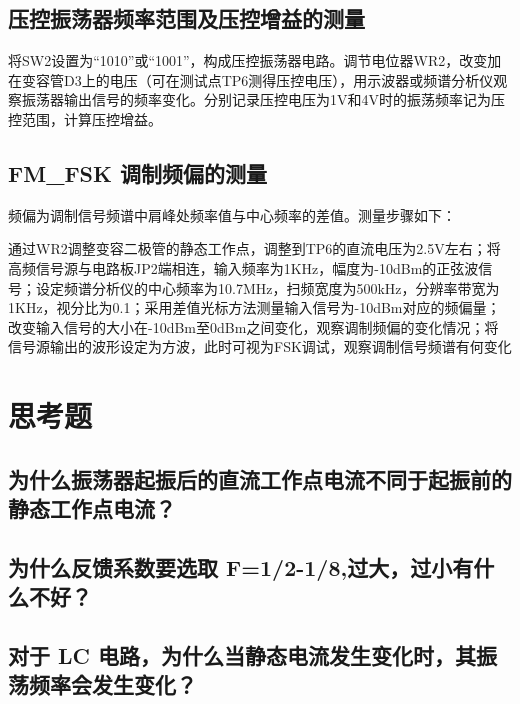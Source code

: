 \documentclass{../source/Experiment}
\begin{document}
\subsection{压控振荡器频率范围及压控增益的测量}

将SW2设置为“1010”或“1001”，构成压控振荡器电路。调节电位器WR2，改变加在变容管D3上的电压（可在测试点TP6测得压控电压），用示波器或频谱分析仪观察振荡器输出信号的频率变化。分别记录压控电压为1V和4V时的振荡频率记为压控范围，计算压控增益。

\subsection{FM\_FSK 调制频偏的测量}

频偏为调制信号频谱中肩峰处频率值与中心频率的差值。测量步骤如下：

通过WR2调整变容二极管的静态工作点，调整到TP6的直流电压为2.5V左右；将高频信号源与电路板JP2端相连，输入频率为1KHz，幅度为-10dBm的正弦波信号；设定频谱分析仪的中心频率为10.7MHz，扫频宽度为500kHz，分辨率带宽为1KHz，视分比为0.1；采用差值光标方法测量输入信号为-10dBm对应的频偏量；改变输入信号的大小在-10dBm至0dBm之间变化，观察调制频偏的变化情况；将信号源输出的波形设定为方波，此时可视为FSK调试，观察调制信号频谱有何变化

\section{思考题}
\subsection{为什么振荡器起振后的直流工作点电流不同于起振前的静态工作点电流？}

\subsection{为什么反馈系数要选取 F=1/2-1/8,过大，过小有什么不好？}

\subsection{对于 LC 电路，为什么当静态电流发生变化时，其振荡频率会发生变化？}
\end{document}
